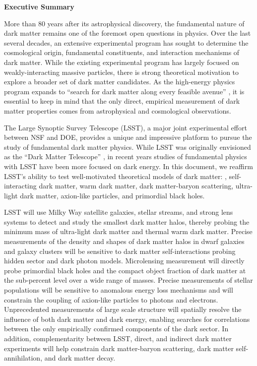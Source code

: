 \begin{center}
  {\Large \bf Executive Summary}
\end{center}

More than 80 years after its astrophysical discovery, the fundamental nature of dark matter remains one of the foremost open questions in physics.
Over the last several decades, an extensive experimental program has sought to determine the cosmological origin, fundamental constituents, and interaction mechanisms of dark matter. 
While the existing experimental program has largely focused on weakly-interacting massive particles, there is strong theoretical motivation to explore a broader set of dark matter candidates.
As the high-energy physics program expands to ``search for dark matter along every feasible avenue'' \citep{P5Report}, it is essential to keep in mind that the only direct, empirical measurement of dark matter properties comes from astrophysical and cosmological observations.

The Large Synoptic Survey Telescope (LSST), a major joint experimental effort between NSF and DOE, provides a unique and impressive platform to pursue the study of fundamental dark matter physics.
While LSST was originally envisioned as the ``Dark Matter Telescope'' \citep{Tyson:2001}, in recent years studies of fundamental physics with LSST have been more focused on dark energy.
In this document, we reaffirm LSST's ability to test well-motivated theoretical models of dark matter: \ie, self-interacting dark matter, warm dark matter, dark matter-baryon scattering, ultra-light dark matter, axion-like particles, and primordial black holes. 

LSST will use Milky Way satellite galaxies, stellar streams, and strong lens systems to detect and study the smallest dark matter halos, thereby probing the minimum mass of ultra-light dark matter and thermal warm dark matter.
Precise measurements of the density and shapes of dark matter halos in dwarf galaxies and galaxy clusters will be sensitive to dark matter self-interactions probing hidden sector and dark photon models.
Microlensing measurement will directly probe primordial black holes and the compact object fraction of dark matter at the sub-percent level over a wide range of masses.
Precise measurements of stellar populations will be sensitive to anomalous energy loss mechanisms and will constrain the coupling of axion-like particles to photons and electrons.
Unprecedented measurements of large scale structure will spatially resolve the influence of both dark matter and dark energy, enabling searches for correlations between the only empirically confirmed components of the dark sector.
In addition, complementarity between LSST, direct, and indirect dark matter experiments will help constrain dark matter-baryon scattering, dark matter self-annihilation, and dark matter decay.

